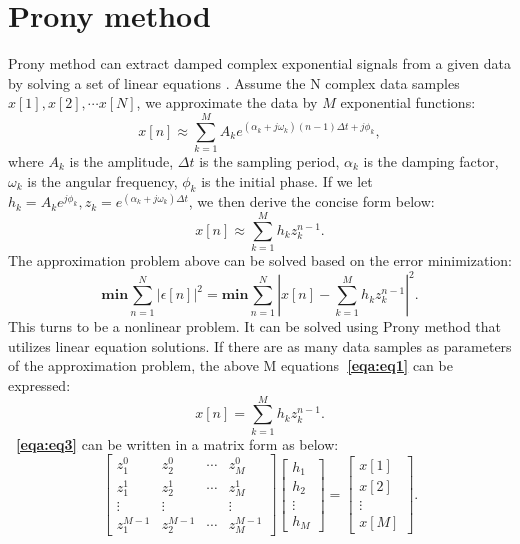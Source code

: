 \section{Prony method}
Prony method can extract damped complex exponential signals 
from a given data by solving a set of linear equations 
\cite[]{prony,prony2003,ThomasPeter2013,Mitrofanov2015}. 
Assume the N complex data samples $x[1],x[2],\cdots x[N]$,
 we approximate the data by $M$ exponential functions:
\begin{equation}
    \label{eqa:eq0}
     x[n] \approx \sum_{k=1}^{M}A_k e^{(\alpha_k + j\omega_k)(n-1)\Delta t + j\phi_k},
\end{equation}
where $A_k$ is the amplitude, $\Delta t$ is the sampling period, 
$\alpha_k$ is the damping factor, $\omega_k$ is the angular frequency, $\phi_k$ is 
the initial phase.
If we let $h_k = A_k e^{j\phi_k}, z_k = e^{(\alpha_k + j\omega_k)\Delta t}$, 
we then derive the concise form below:
\begin{equation}
    \label{eqa:eq1}
     x[n] \approx \sum_{k=1}^{M}h_k z_k^{n-1}.
\end{equation}
The approximation problem above can be solved based on the error minimization:
\begin{equation}
    \label{eqa:eq2}
    \mathbf{min} \sum_{n=1}^{N} \left|\epsilon[n]\right|^2 = 
    \mathbf{min}\sum_{n=1}^{N}\left | x[n] - \sum_{k=1}^{M}h_k z_k^{n-1}\right|^2.
\end{equation}
This turns to be a nonlinear problem. It can be solved using 
Prony method that utilizes linear equation solutions.
If there are as many data samples as parameters of the approximation problem,
the above M equations\textbf{~\ref{eqa:eq1}} can be expressed:
\begin{equation}
    \label{eqa:eq3}
     x[n] = \sum_{k=1}^{M}h_k z_k^{n-1}.
\end{equation}
\textbf{~\ref{eqa:eq3}} can be written in a matrix form as below:
\begin{equation}
    \label{eqa:eq4}
    \left[ \begin{array}{cccc}
        z_1^0 & z_2^0 & \cdots & z_M^0\\
        z_1^1 & z_2^1 & \cdots & z_M^1\\
        \vdots & \vdots & & \vdots\\
        z_1^{M-1} & z_2^{M-1} & \cdots & z_M^{M-1}
    \end{array} \right]
    \left[ \begin{array}{c} h_1\\ h_2\\ \vdots \\ h_M
    \end{array} \right] =
    \left[ \begin{array}{c} x[1]\\ x[2]\\ \vdots \\ x[M]
    \end{array} \right].
\end{equation}
